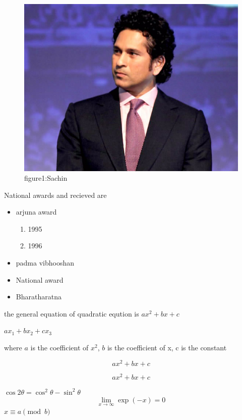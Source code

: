\documentclass{article}
\begin{document}
	\begin{figure}
		\centering
		\label{sachin}
		\includegraphics[scale = 0.25]{Sachin-01.jpg}
		\caption{figure1:Sachin}
	\end{figure}

	\pagebreak
	National awards and recieved are
	\begin{itemize}
		\item arjuna award
			\begin{enumerate}
				\item 1995
				\item 1996
			\end{enumerate}
		\item padma vibhooshan
		\item National award
		\item Bharatharatna
	\end{itemize}
	\pagebreak
	
	the general equation of quadratic eqution is $ax^{2}+bx+c$
	
	$ax_{1}+bx_{2}+cx_{3}$
	
	where $a$ is the coefficient of $x^{2}$, $b$ is the coefficient of x, c is the constant
	
	\begin{displaymath}
		ax^{2}+bx+c
	\end{displaymath}

	\begin{equation}
		ax^{2}+bx+c
	\end{equation}


	$\cos 2\theta = \cos^{2}\theta - \sin^{2}\theta$
	\begin{equation}
		\lim_{x\to\infty} \exp(-x) = 0
	\end{equation}
	$x\equiv a\pmod b$

		
\end{document}
